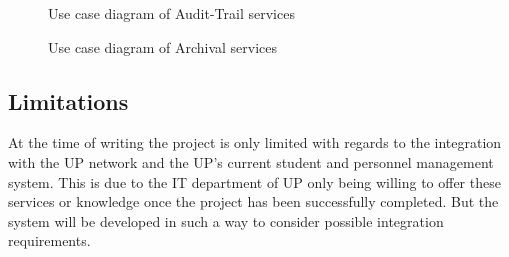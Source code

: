 \documentclass[12pt]{article}
\begin{document}
\begin{figure}[H]
\centering	
{}
\caption{Use case diagram of Audit-Trail services}
\end{figure}

\begin{figure}[H]
\centering	
{}
\caption{Use case diagram of Archival services}
\end{figure}

\vspace{0.2in}
\subsection{Limitations}
\vspace{0.2in}
At the time of writing the project is only limited with regards to the integration with the UP network and the UP's current student and personnel management system. This is due to the IT department of UP only being willing to offer these services or knowledge once the project has been successfully completed. But the system will be developed in such a way to consider possible integration requirements.
\end{document}
